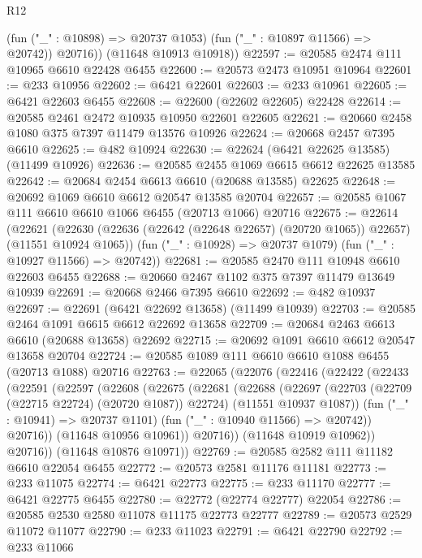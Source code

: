 \begin{lexlean}{R12}
\begin{coremodule}
            (fun ("_" : @10898) => @20737 @1053)
            (fun ("_" : @10897 @11566) => @20742))
          @20716))
      (@11648 @10913 @10918))
@22597 := @20585 @2474 @111 @10965 @6610 @22428 @6455
@22600 := @20573 @2473 @10951 @10964
@22601 := @233 @10956
@22602 := @6421 @22601
@22603 := @233 @10961
@22605 := @6421 @22603 @6455
@22608 := @22600 (@22602 @22605) @22428
@22614 := @20585 @2461 @2472 @10935 @10950 @22601 @22605
@22621 := @20660 @2458 @1080 @375 @7397 @11479 @13576 @10926
@22624 := @20668 @2457 @7395 @6610
@22625 := @482 @10924
@22630 := @22624 (@6421 @22625 @13585) (@11499 @10926)
@22636 := @20585 @2455 @1069 @6615 @6612 @22625 @13585
@22642 := @20684 @2454 @6613 @6610 (@20688 @13585) @22625
@22648 := @20692 @1069 @6610 @6612 @20547 @13585 @20704
@22657 := @20585 @1067 @111 @6610 @6610 @1066 @6455 (@20713 @1066) @20716
@22675 := @22614
    (@22621
      (@22630 (@22636 (@22642 (@22648 @22657) (@20720 @1065)) @22657) (@11551 @10924 @1065))
      (fun ("_" : @10928) => @20737 @1079)
      (fun ("_" : @10927 @11566) => @20742))
@22681 := @20585 @2470 @111 @10948 @6610 @22603 @6455
@22688 := @20660 @2467 @1102 @375 @7397 @11479 @13649 @10939
@22691 := @20668 @2466 @7395 @6610
@22692 := @482 @10937
@22697 := @22691 (@6421 @22692 @13658) (@11499 @10939)
@22703 := @20585 @2464 @1091 @6615 @6612 @22692 @13658
@22709 := @20684 @2463 @6613 @6610 (@20688 @13658) @22692
@22715 := @20692 @1091 @6610 @6612 @20547 @13658 @20704
@22724 := @20585 @1089 @111 @6610 @6610 @1088 @6455 (@20713 @1088) @20716
@22763 := @22065
    (@22076
      (@22416
        (@22422
          (@22433
            (@22591
              (@22597
                (@22608
                  (@22675
                    (@22681
                      (@22688
                        (@22697
                          (@22703 (@22709 (@22715 @22724) (@20720 @1087)) @22724)
                          (@11551 @10937 @1087))
                        (fun ("_" : @10941) => @20737 @1101)
                        (fun ("_" : @10940 @11566) => @20742))
                      @20716))
                  (@11648 @10956 @10961))
                @20716))
            (@11648 @10919 @10962))
          @20716))
      (@11648 @10876 @10971))
@22769 := @20585 @2582 @111 @11182 @6610 @22054 @6455
@22772 := @20573 @2581 @11176 @11181
@22773 := @233 @11075
@22774 := @6421 @22773
@22775 := @233 @11170
@22777 := @6421 @22775 @6455
@22780 := @22772 (@22774 @22777) @22054
@22786 := @20585 @2530 @2580 @11078 @11175 @22773 @22777
@22789 := @20573 @2529 @11072 @11077
@22790 := @233 @11023
@22791 := @6421 @22790
@22792 := @233 @11066

\end{coremodule}
\end{lexlean}
